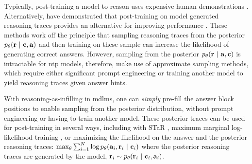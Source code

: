 Typically, post-training a model to reason uses expensive human demonstrations \citep{ouyang2022traininglanguagemodelsfollow}. Alternatively, \cite{zelikman2022star,phan2023training,ruan2025reasoning} have demonstrated that post-training on model generated reasoning traces provides an alternative for improving performance \citep{zelikman2022star,phan2023training,ruan2025reasoning}. These methods work off the principle that sampling reasoning traces from the posterior $p_\theta(\mathbf{r} ~\vert~ \mathbf{c}, \mathbf{a})$ and then training on these sample can increase the likelihood of generating correct answers. However, sampling from the posterior $p_\theta(\mathbf{r} ~\vert~ \mathbf{a}, \mathbf{c})$ is intractable for \gls{ntp} models, therefore, \citet{phan2023training,zelikman2022star} make use of approximate sampling methods, which require either significant prompt engineering or training another model to yield reasoning traces given answer hints. 


With {reasoning-as-infilling} in \glspl{mdlm}, one can \textit{simply} pre-fill the answer block positions to enable sampling from the posterior distribution, without prompt engineering or having to train another model. These posterior traces can be used for post-training in several ways, including with STaR \citep{zelikman2022star}, maximum marginal log-likelihood training \citep{phan2023training,pml2Book}, or maximizing the likelihood on the answer and the posterior reasoning traces: $\max_\theta \sum_{i=1}^N \log p_\theta(\mathbf{a}_i, \mathbf{r}_i ~\vert~ \mathbf{c}_i)$ where the posterior reasoning traces are generated by the model, $\mathbf{r}_i \sim p_\theta(\mathbf{r}_i ~\vert~ \mathbf{c}_i, \mathbf{a}_i)$. 

